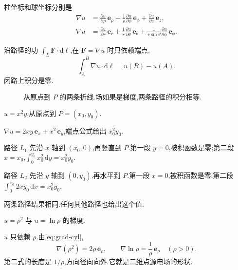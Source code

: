 柱坐标和球坐标分别是
\begin{align}
  \nabla u
  &=\frac{\partial u}{\partial\rho}\,\mathbf{e}_{\rho}
    +\frac{1}{\rho}\frac{\partial u}{\partial\phi}\,\mathbf{e}_{\phi}
    +\frac{\partial u}{\partial z}\,\mathbf{e}_z,
  \label{eq:grad-cyl} \\
  \nabla u
  &=\frac{\partial u}{\partial r}\,\mathbf{e}_r
    +\frac{1}{r}\frac{\partial u}{\partial\theta}\,\mathbf{e}_{\theta}
    +\frac{1}{r\sin\theta}\frac{\partial u}{\partial\phi}\,\mathbf{e}_{\phi}.
  \label{eq:grad-sph}
\end{align}

沿路径的功 $\int_L\mathbf{F}\cdot\mathrm{d}\boldsymbol{\ell}$,在 $\mathbf{F}=\nabla u$ 时只依赖端点,
\begin{equation}
  \int_A^B\nabla u\cdot\mathrm{d}\boldsymbol{\ell}=u(B)-u(A).
\end{equation}
闭路上积分是零.

\begin{figure}[htb]
  \centering
  
  \caption{从原点到 $P$ 的两条折线.场如果是梯度,两条路径的积分相等.}
  \label{fig:two-paths}
\end{figure}

\begin{example}
$u=x^2 y$,从原点到 $P=(x_0,y_0)$.
\end{example}
\begin{solution}
$\nabla u=2xy\,\mathbf{e}_x+x^2\,\mathbf{e}_y$,端点公式给出 $x_0^2 y_0$.

路径 $L_1$ 先沿 $x$ 轴到 $(x_0,0)$,再竖直到 $P$.第一段 $y=0$,被积函数是零;第二段 $x=x_0$,$\int_0^{y_0} x_0^2\,\mathrm{d}y=x_0^2 y_0$.

路径 $L_2$ 先沿 $y$ 轴到 $(0,y_0)$,再水平到 $P$.第一段 $x=0$,被积函数是零;第二段 $\int_0^{x_0} 2x y_0\,\mathrm{d}x=x_0^2 y_0$.

两条路径结果相同.任何其他路径也给出这个值.
\end{solution}

\begin{example}
$u=\rho^2$ 与 $u=\ln\rho$ 的梯度.
\end{example}
\begin{solution}
$u$ 只依赖 $\rho$.由\eqref{eq:grad-cyl},
\begin{equation}
  \nabla(\rho^2)=2\rho\,\mathbf{e}_{\rho},
  \qquad
  \nabla\ln\rho=\frac{1}{\rho}\,\mathbf{e}_{\rho}
  \quad(\rho>0).
\end{equation}
第二式的长度是 $1/\rho$,方向径向向外.它就是二维点源电场的形状.
\end{solution}

